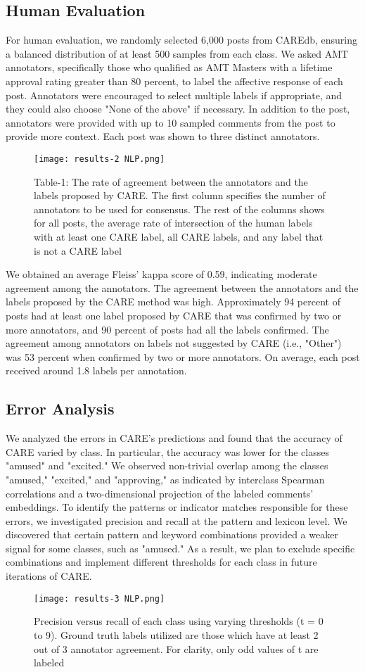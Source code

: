 \documentclass[conference]{IEEEtran}
\begin{document}
\subsection{Human Evaluation}
For human evaluation, we randomly selected 6,000 posts from CAREdb, ensuring a balanced distribution of at least 500 samples from each class. We asked AMT annotators, specifically those who qualified as AMT Masters with a lifetime approval rating greater than 80 percent, to label the affective response of each post. Annotators were encouraged to select multiple labels if appropriate, and they could also choose "None of the above" if necessary. In addition to the post, annotators were provided with up to 10 sampled comments from the post to provide more context. Each post was shown to three distinct annotators.
\begin{figure}[h]
    \centering
    \texttt{[image: results-2 NLP.png]}
    \caption{Table-1: The rate of agreement between the annotators
and the labels proposed by CARE. The first column
specifies the number of annotators to be used for consensus. The rest of the columns shows for all posts, the
average rate of intersection of the human labels with at
least one CARE label, all CARE labels, and any label
that is not a CARE label}
    \label{fig:4}
\end{figure}
We obtained an average Fleiss' kappa score of 0.59, indicating moderate agreement among the annotators. The agreement between the annotators and the labels proposed by the CARE method was high. Approximately 94 percent of posts had at least one label proposed by CARE that was confirmed by two or more annotators, and 90 percent of posts had all the labels confirmed. The agreement among annotators on labels not suggested by CARE (i.e., "Other") was 53 percent when confirmed by two or more annotators. On average, each post received around 1.8 labels per annotation.

\subsection{Error Analysis}
We analyzed the errors in CARE's predictions and found that the accuracy of CARE varied by class. In particular, the accuracy was lower for the classes "amused" and "excited." We observed non-trivial overlap among the classes "amused," "excited," and "approving," as indicated by interclass Spearman correlations and a two-dimensional projection of the labeled comments' embeddings. To identify the patterns or indicator matches responsible for these errors, we investigated precision and recall at the pattern and lexicon level. We discovered that certain pattern and keyword combinations provided a weaker signal for some classes, such as "amused." As a result, we plan to exclude specific combinations and implement different thresholds for each class in future iterations of CARE.
\begin{figure}[h]
    \centering
    \texttt{[image: results-3 NLP.png]}
    \caption{Precision versus recall of each class using
varying thresholds (t = 0 to 9). Ground truth labels
utilized are those which have at least 2 out of 3 annotator
agreement. For clarity, only odd values of t are labeled}
    \label{fig:5}
\end{figure}
\end{document}
